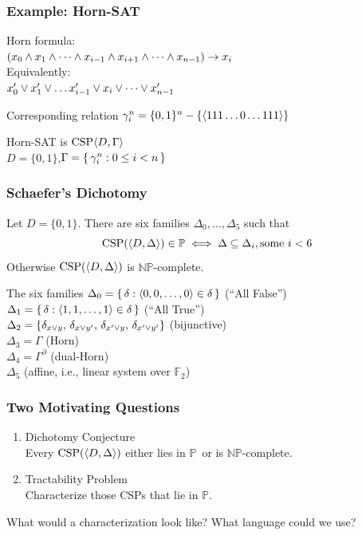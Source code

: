 \documentclass[12pt,xcolor=dvipsnames%
   ]{beamer}
\renewcommand{\cite}[1]{\relax}
\newcommand{\bigpause}{\pause\bigskip}
\DeclareMathOperator{\CSP}{CSP}
\newcommand{\FF}{\mathbb{F}}
\renewcommand{\.}{\cdot}
\newcommand{\NP}{\ensuremath{\mathbb{NP}}\xspace}
\renewcommand{\P}{\ensuremath{\mathbb{P}}\xspace}
\let\emph=\alert
\begin{document}
\begin{frame}
\frametitle{Example: Horn-SAT}
\emph{Horn formula:}\\
 $(x_0 \wedge x_1 \wedge \cdots \wedge x_{i-1} \wedge x_{i+1} \wedge \cdots \wedge x_{n-1}) \rightarrow x_i$\\[6pt]
\emph{Equivalently:}\\
 $x_0' \vee x_1' \vee \dots x_{i-1}' \vee x_i \vee \cdots \vee x_{n-1}'$

\bigpause
Corresponding relation $\gamma^n_i = \{0,1\}^n-\{\langle111\dots0\dots111\rangle\}$

\bigpause
Horn-SAT is $\CSP\<D,\Gamma\>$\\
$D=\{0,1\}$,\quad $\Gamma=\left\{\,\gamma^n_i : 0\leq i <n\,\right\}$
\end{frame}

\begin{frame}
  \frametitle{Schaefer's Dichotomy}

  \begin{theorem}[Schaefer, 1978 \cite{Schaefer1978}]
    Let $D=\{0,1\}$. There are six families $\Delta_0,
  \dots, \Delta_5$ such that
  \begin{equation*}
    \CSP(\<D,\Delta\>) \in \P \iff \Delta \sseq \Delta_i, \text{some $i< 6$}
  \end{equation*}
  Otherwise $\CSP(\<D,\Delta\>)$ is $\NP$-complete.
\end{theorem}
\end{frame}

\begin{frame}
{\large The six families}
$\Delta_0 = \left\{\,\delta : \langle0,0,\dots,0\rangle\in \delta\,\right\}$ (``All False'')\\[2pt]
$\Delta_1 = \left\{\,\delta : \langle1,1,\dots,1\rangle\in \delta\,\right\}$ (``All True'')\\[2pt]
$\Delta_2 = \{\delta_{x\vee y},\, \delta_{x\vee y'},\,\delta_{x'\vee y},\, \delta_{x'\vee y'}\}$ (bijunctive)\\[2pt]
$\Delta_3 = \Gamma$ (Horn)\\[2pt]
$\Delta_4 = \Gamma^\partial$ (dual-Horn)\\[2pt]
$\Delta_5$ (affine, i.e., linear system over $\FF_2$)
\end{frame}

\begin{frame}
  \frametitle{Two Motivating Questions}

  \begin{enumerate}
  \item \emph{Dichotomy Conjecture}\\ Every $\CSP(\<D,\Delta\>)$ either
    lies in \P\ or is $\NP$-complete.

    \pause

  \item \emph{Tractability Problem}\\ Characterize those CSPs that lie in \P.
  \end{enumerate}
  
  \pause
  What would a characterization look like? What language could we use?
\end{frame}
\end{document}
